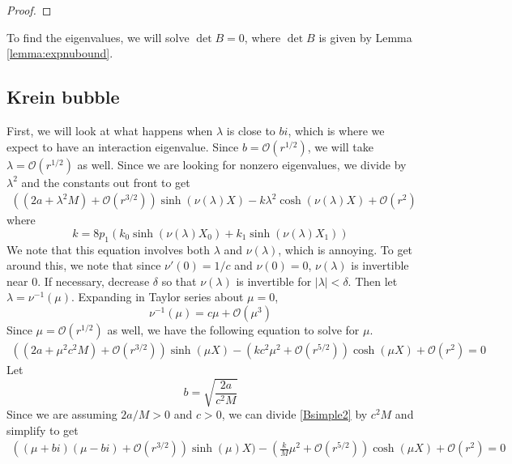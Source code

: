 \documentclass[thesis.tex]{subfiles}
\begin{document}
\begin{lemma}
\begin{proof}
\end{proof}
\end{lemma}

To find the eigenvalues, we will solve $\det B = 0$, where $\det B$ is given by Lemma \cref{lemma:expnubound}. 

\subsection{Krein bubble}

First, we will look at what happens when $\lambda$ is close to $bi$, which is where we expect to have an interaction eigenvalue. Since $b = \mathcal{O}(r^{1/2})$, we will take $\lambda = \mathcal{O}(r^{1/2})$ as well. Since we are looking for nonzero eigenvalues, we divide by $\lambda^2$ and the constants out front to get
\begin{equation}\label{Bsimple1}
\begin{aligned}
\left((2a + \lambda^2 M) +  \mathcal{O}( r^{3/2} )\right) \sinh(\nu(\lambda)X) - k \lambda^2 \cosh(\nu(\lambda)X)+ \mathcal{O}( r^2 ) 
\end{aligned}
\end{equation}
where
\begin{equation}\label{2pdefk}
k = 8 p_1 ( k_0\sinh(\nu(\lambda)X_0) + k_1 \sinh(\nu(\lambda)X_1) ) 
\end{equation}
We note that this equation involves both $\lambda$ and $\nu(\lambda)$, which is annoying. To get around this, we note that since $\nu'(0) = 1/c$ and $\nu(0) = 0$, $\nu(\lambda)$ is invertible near 0. If necessary, decrease $\delta$ so that $\nu(\lambda)$ is invertible for $|\lambda| < \delta$. Then let $\lambda = \nu^{-1}(\mu)$. Expanding in Taylor series about $\mu = 0$, 
\[
\nu^{-1}(\mu) = c \mu + \mathcal{O}(\mu^3)
\]
Since $\mu = \mathcal{O}(r^{1/2})$ as well, we have the following equation to solve for $\mu$.
\begin{equation}\label{Bsimple2}
\begin{aligned}
\left((2a + \mu^2 c^2 M) +  \mathcal{O}( r^{3/2} )\right) \sinh(\mu X) - \left(k c^2 \mu^2 + \mathcal{O}( r^{5/2} ) \right)\cosh(\mu X)+ \mathcal{O}( r^2 ) = 0
\end{aligned}
\end{equation}
Let
\[
b = \sqrt{\frac{2a}{c^2 M}}
\]
Since we are assuming $2a/M > 0$ and $c>0$, we can divide \cref{Bsimple2} by $c^2 M$ and simplify to get
\begin{equation}\label{Bsimple2}
\begin{aligned}
\left((\mu + b i)(\mu - b i) +  \mathcal{O}( r^{3/2} )\right) \sinh(\mu )X) - \left(\frac{k}{M} \mu^2 + \mathcal{O}( r^{5/2} ) \right)\cosh(\mu X)+ \mathcal{O}( r^2 ) = 0
\end{aligned}
\end{equation}
\end{document}
